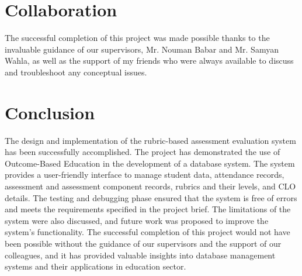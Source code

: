 \documentclass[12pt,a4paper]{article}
\begin{document}
\section{Collaboration}
The successful completion of this project was made possible thanks to the invaluable guidance of our supervisors, Mr. Nouman Babar and Mr. Samyan Wahla, as well as the support of my friends who were always available to discuss and troubleshoot any conceptual issues.

\section{Conclusion}
The design and implementation of the rubric-based assessment evaluation system has been successfully accomplished. The project has demonstrated the use of Outcome-Based Education in the development of a database system. The system provides a user-friendly interface to manage student data, attendance records, assessment and assessment component records, rubrics and their levels, and CLO details. The testing and debugging phase ensured that the system is free of errors and meets the requirements specified in the project brief. The limitations of the system were also discussed, and future work was proposed to improve the system's functionality. The successful completion of this project would not have been possible without the guidance of our supervisors and the support of our colleagues, and it has provided valuable insights into database management systems and their applications in education sector.
\end{document}
